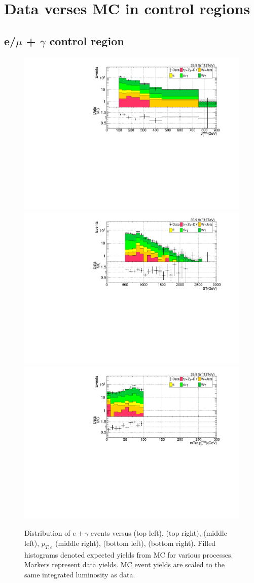 \chapter{Data verses MC in control regions} %

\label{AppendixC}
\section{e/$\mu$ + $\gamma$ control region}
\begin{figure}[h!]
\centering
\caption[Data vs MC for $e\gamma$ CR]{Distribution of $e+\gamma$ events versus \ptmiss (top left), \ST (top right), 
\mt (middle left), $p_{T,e}$ (middle right), \nj (bottom left), \nb (bottom right).  
Filled histograms denoted expected yields from MC for various processes.  Markers represent data yields.
MC event yields are scaled to the same integrated luminosity as data.}
\label{fig:lost_e_CR_dist}
\includegraphics[width=0.48\linewidth]{../Figures/Chap3/lost_lepton/METvarBin_Ele1.pdf}
\includegraphics[width=0.48\linewidth]{../Figures/Chap3/lost_lepton/ST_Ele1.pdf}\\
\includegraphics[width=0.48\linewidth]{../Figures/Chap3/lost_lepton/MT_Ele.pdf}

\end{figure}
